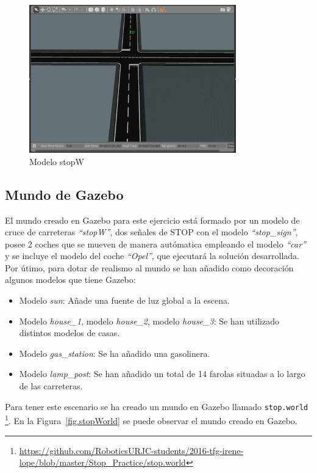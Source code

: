 \begin{figure}[H]
  \begin{center}
    \includegraphics[width=0.8\textwidth]{figures/Stop/stopW.png}
		\caption{Modelo stopW}
		\label{fig.stopW}
		\end{center}
\end{figure}

\subsection{Mundo de Gazebo}
El mundo creado en Gazebo para este ejercicio está formado por un modelo de cruce de carreteras \textit{``stopW''}, dos señales de STOP con el modelo \textit{``stop\_sign''}, posee 2 coches que se mueven de manera autómatica empleando el modelo \textit{``car''} y se incluye el modelo del coche \textit{``Opel''}, que ejecutará la solución desarrollada. Por útimo, para dotar de realismo al mundo se han añadido como decoración algunos modelos que tiene Gazebo:

\begin{itemize}
\item	Modelo \textit{sun}: Añade una fuente de luz global a la escena.
\item	Modelo \textit{house\_1}, modelo \textit{house\_2}, modelo \textit{house\_3}: Se han utilizado distintos modelos de casas.
\item	Modelo \textit{gas\_station}: Se ha añadido una gasolinera.
\item	Modelo \textit{lamp\_post}: Se han añadido un total de 14 farolas situadas a lo largo de las carreteras.
\end{itemize}

Para tener este escenario se ha creado un mundo en Gazebo llamado \texttt{stop.world} \footnote{\url{https://github.com/RoboticsURJC-students/2016-tfg-irene-lope/blob/master/Stop_Practice/stop.world}}. En la Figura~\ref{fig.stopWorld} se puede observar el mundo creado en Gazebo.

